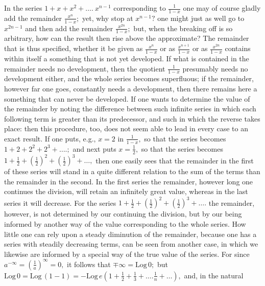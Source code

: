 \documentclass[12pt,a4paper,openany]{book}
\newcommand{\opage}[1]{\marginnote{\footnotesize\textit{[#1]}}}
\begin{document}
In the series $1+x+x^{2}+\ldots.\ x^{n-1}$ corresponding to $\frac{1}{1-x}$ one may of course gladly add the remainder $\frac{x^{n}}{1-x};$ yet, why stop at $x^{n-1}?$ one might just as well go to $x^{2n-1}$ and then add the remainder $\frac{x^{2n}}{1-x};$ but, when the breaking off
\setcounter{footnote}{0}%
\opage{54}is so arbitrary, how can the result then rise above the approximate? The remainder that is thus specified, whether it be given as $\frac{x^{n}}{1-x}$ or as $\frac{x^{n+1}}{1-x}$ or as $\frac{x^{2n}}{1-x}$ contains within itself a something that is not yet developed. If what is contained in the remainder needs no development, then the quotient $\frac{1}{1-x}$ presumably needs no development either, and the whole series becomes superfluous; if the remainder, however far one goes, constantly needs a development, then there remains here a something that can never be developed. If one wants to determine the value of the remainder by noting the difference between such infinite series in which each following term is greater than its predecessor, and such in which the reverse takes place: then this procedure, too, does not seem able to lead in every case to an exact result. If one puts, e.g., $x=2$ in $\frac{1}{1-x},$ so that the series becomes $1+2+2^{2}+2^{3}+\ldots.;$ and next puts $x=\frac{1}{2},$ so that the series becomes $1+\frac{1}{2}+\left(\frac{1}{2}\right)^{2}+\left(\frac{1}{2}\right)^{3}+\ldots,$ then one easily sees that the remainder in the first of these series will stand in a quite different relation to the sum of the terms than the remainder in the second. In the first series the remainder, however long one continues the division, will retain an infinitely great value, whereas in the last series it will decrease. For the series $1+\frac{1}{2}+\left(\frac{1}{2}\right)^{2}+\left(\frac{1}{2}\right)^{3}+\ldots.$ the remainder, however, is not determined by our continuing the division, but by our being informed by another way of the value corresponding to the whole series. How little one can rely upon a steady diminution of the remainder, because one has a series with steadily decreasing terms, can be seen from another case, in which we likewise are informed by a special way of
\setcounter{footnote}{0}%
\opage{55}the true value of the series. For since $a^{-\infty}=\left(\frac{1}{a}\right)^{\infty}=0,$ it follows that $\mp\infty=\mathrm{Log}\,0;$ but $\mathrm{Log}\,0=\mathrm{Log}\,(1-1)=-\mathrm{Log}\,e\left(1+\frac{1}{2}+\frac{1}{3}+\ldots.\frac{1}{n}+\ldots\right),$ and, in the natural %
\end{document}
